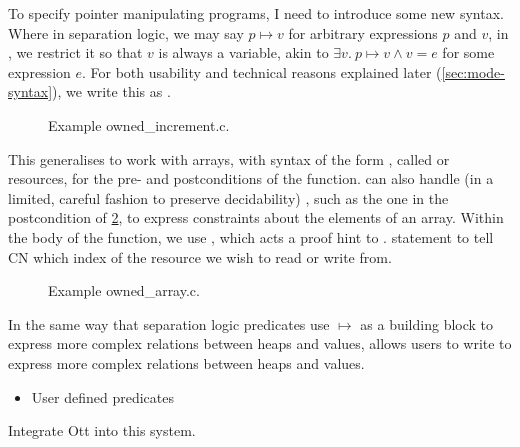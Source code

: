 To specify pointer manipulating programs, I need to introduce some new syntax.
Where in separation logic, we may say $p \mapsto v$ for arbitrary expressions
$p$ and $v$, in , we restrict it so that $v$ is always a variable, akin
to $\exists{} v.\ p \mapsto v \wedge v = e$ for some expression $e$. For both
usability and technical reasons explained later (\cref{sec:mode-syntax}), we
write this as . %

\begin{figure}[h]
    \centering
    \caption{Example owned\_increment.c.}\label{fig:owned-incr}
\end{figure}

This generalises to work with arrays, with syntax of the form , called  or %
 resources, for the pre- and postconditions of the function.
 can also handle (in a limited, careful fashion to preserve
decidability) , such as the one in the
postcondition of \cref{fig:owned-array}, to express constraints about the
elements of an array. Within the body of the function, we use , which acts a proof hint to .  statement to tell CN which index of the  resource we wish
to read or write from.

\begin{figure}[h]
    \centering
    \caption{Example owned\_array.c.}\label{fig:owned-array}
\end{figure}

In the same way that separation logic predicates use $\mapsto$ as a building
block to express more complex relations between heaps and  values,
 allows users to write  to express more
complex relations between heaps and  values.

\begin{itemize}
    \item User defined predicates
\end{itemize}

\begin{marginfigure}
  \ContinuedFloat*
  \begin{mathpar}
      \label{rule:cic-var}
  \end{mathpar}
  \caption{Integrate Ott into this system.}\label{fig:cic-var}
\end{marginfigure}

